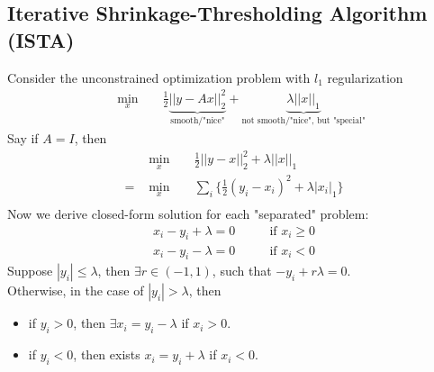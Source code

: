 \documentclass[12pt]{report}
\begin{document}
\subsection{Iterative Shrinkage-Thresholding Algorithm (ISTA)}
Consider the unconstrained optimization problem with $l_1$ regularization
\begin{equation}
\begin{aligned}
    & \underset{x}{\text{ min }}
    && \frac{1}{2}\underbrace{|| y - Ax ||_2^2}_{\text{smooth/"nice"}}
    + \underbrace{  \lambda || x ||_1 }_{\text{not smooth/"nice", but "special"}}
\end{aligned}
\end{equation}
Say if $A = I$, then
\begin{equation}
\begin{aligned}
    & \underset{x}{\text{ min }} 
    && \frac{1}{2} || y - x ||_2^2 + \lambda || x ||_1 \\
    = 
    & \underset{x}{\text{ min }} 
    && \sum_i \{ \frac{1}{2} ( y_i - x_i )^2  + \lambda | x_i |_1 \} \\
\end{aligned}
\end{equation}
Now we derive closed-form solution for each "separated" problem: 
\begin{equation}
\begin{aligned}
    x_i-y_i + \lambda =0 & && \text{ if } x_i \geq 0 \\
    x_i-y_i - \lambda =0 & && \text{ if } x_i < 0
\end{aligned}
\end{equation}
Suppose $|y_i| \leq \lambda$, then $\exists r \in (-1,1)$, such that $-y_i + r \lambda = 0$.  \\
Otherwise, in the case of $|y_i| > \lambda$, then 
\begin{itemize}
    \item if $y_i > 0$, then $\exists x_i = y_i - \lambda$ if $x_i > 0$.
    \item if $y_i < 0$, then exists $x_i = y_i + \lambda$ if $x_i < 0$. 
\end{itemize}
\end{document}
